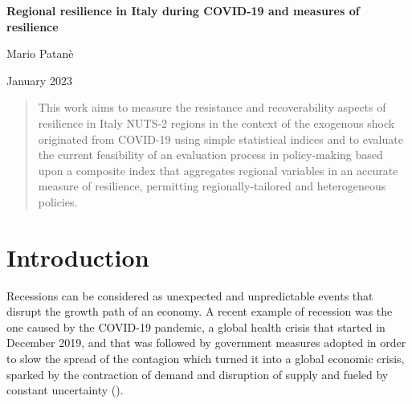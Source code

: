 \documentclass[12pt]{article}
\begin{document}
\begin{center}
{\LARGE \textbf{Regional resilience in Italy during COVID-19 and measures of resilience}}
        
\vspace{0.4cm}
{\large Mario Patanè}

\vspace{0.4cm}

{\large January 2023}
\end{center}
\vspace{0.4cm}
\begin{onehalfspace}
\begin{abstract}
    \vspace{0.2cm}
    \centering
    \begin{minipage}{5in}
        This work aims to measure the resistance and recoverability aspects of resilience in Italy NUTS-2 regions in the context of the exogenous shock originated from COVID-19 using simple statistical indices and to evaluate the current feasibility of an evaluation process in policy-making based upon a composite index that aggregates regional variables in an accurate measure of resilience, permitting regionally-tailored and heterogeneous policies.
    \end{minipage}
\end{abstract}
\end{onehalfspace}
\vspace{0.2cm}





\section{Introduction}

Recessions can be considered as unexpected and unpredictable events that disrupt the growth path of an economy. A recent example of recession was the one caused by the COVID-19 pandemic, a global health crisis that started in December 2019, and that was followed by government measures adopted in order to slow the spread of the contagion which turned it into a global economic crisis, sparked by the contraction of demand and disruption of supply and fueled by constant uncertainty (\cite{meinen_regional_2021}).
\end{document}
